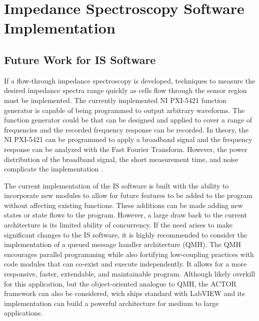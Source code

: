\section{Impedance Spectroscopy Software Implementation}


\subsection{Future Work for IS Software}

\par If a flow-through impedance spectroscopy is developed, techniques to measure the desired impedance spectra range quickly as cells flow through the sensor region must be implemented. The currently implemented NI PXI-5421 function generator is capable of being programmed to output arbitrary waveforms. The function generator could be  that can be designed and applied to cover a range of frequencies and the recorded frequency response can be recorded. In theory, the NI PXI-5421 can be programmed to apply a broadband signal and the frequency response can be analyzed with the Fast Fourier Transform. However, the power distribution of the broadband signal, the short measurement time, and noise complicate the implementation \cite{sun_digital_2009,sun_broadband_2007,min_broadband_2010}. 

\par The current implementation of the IS software is built with the ability to incorporate new modules to allow for future features to be added to the program without affecting existing functions. These additions can be made adding new states or state flows to the program. However, a large draw back to the current architecture is its limited ability of concurrency. If the need arises to make significant changes to the IS software, it is highly recommended to consider the implementation of a queued message handler architecture (QMH). The QMH encourages parallel programming while also fortifying low-coupling practices with code modules that can co-exist and execute independently. It allows for a more responsive, faster, extendable, and maintainable program. Although likely overkill for this application, but the object-oriented analogue to QMH, the ACTOR framework can also be considered, wich ships standard with LabVIEW and its implementation can build a powerful architecture for medium to large applications.